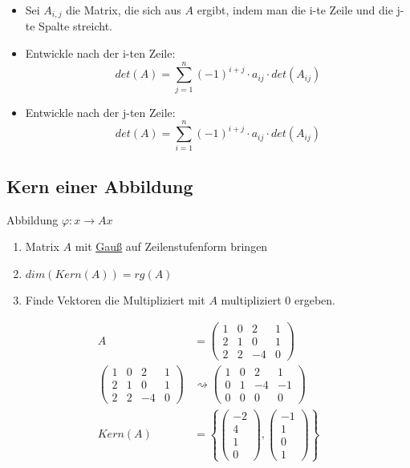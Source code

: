 \documentclass{scrartcl}
\newcommand{\linkToRef}[2][ref]{\hyperref[#1]{\underline{#2}}}
\begin{document}
\begin{itemize}
\item Sei $A_{i,j}$ die Matrix, die sich aus $A$ ergibt, indem man die i-te Zeile und die j-te Spalte streicht.
\item Entwickle nach der i-ten Zeile:
\[det (A) = \sum_{j=1}^{n} (-1)^{i+j} \cdot a_{ij} \cdot det(A_{ij}) \]
\item Entwickle nach der j-ten Zeile:
\[det (A) = \sum_{i=1}^{n} (-1)^{i+j} \cdot a_{ij} \cdot det(A_{ij}) \]
\end{itemize}


\subsection{Kern einer Abbildung}

Abbildung \(\varphi: x \rightarrow Ax\)
\begin{enumerate}[label={(\arabic*)}]
    \item Matrix $A$ mit \linkToRef[Gauss]{Gauß} auf Zeilenstufenform bringen
    \item $dim(Kern(A)) = rg(A)$
    \item Finde Vektoren die Multipliziert mit $A$ multipliziert 0 ergeben.
\end{enumerate}

\begin{Beispiel}
    \begin{align*}
        A &= \begin{pmatrix} 1 & 0 & 2 & 1 \\
2 & 1 & 0  & 1 \\
2 & 2 & -4 & 0
\end{pmatrix}\\
        \begin{pmatrix} 1 & 0 & 2 & 1 \\
        2 & 1 & 0  & 1 \\
        2 & 2 & -4 & 0
        \end{pmatrix} &\rightsquigarrow \begin{pmatrix} 1 & 0 & 2 & 1 \\
        0 & 1 & -4  & -1 \\
        0 & 0 & 0 & 0
        \end{pmatrix}\\
        Kern(A) &= \left\{ \begin{pmatrix} -2 \\ 4 \\ 1 \\ 0 \end{pmatrix}, \begin{pmatrix} -1 \\ 1 \\ 0 \\ 1 \end{pmatrix} \right\}
    \end{align*}
\end{Beispiel}
\end{document}
